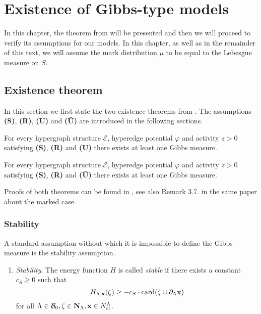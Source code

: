 \chapter{Existence of Gibbs-type models}\label{ch:3}
In this chapter, the theorem from \cite{DDG12} will be presented and then we will proceed to verify its assumptions for our models. In this chapter, as well as in the remainder of this text, we will assume  the mark distribution $\mu$ to be equal to the Lebesgue measure on $S$.

\section{Existence theorem}
In this section we first state the two existence theorems from \cite{DDG12}. The assumptions  \textbf{(S)}, \textbf{(R)}, \textbf{(U)} and \textbf{(\^U)} are introduced in the following sections. 

\begin{theorem}
	For every hypergraph structure $\mathcal E$, hyperedge potential $\varphi$ and activity $z>0$ satisfying \textbf{(S)}, \textbf{(R)} and \textbf{(U)} there exists at least one Gibbs measure.
\end{theorem}

\begin{theorem}
	For every hypergraph structure $\mathcal E$, hyperedge potential $\varphi$ and activity $z>0$ satisfying \textbf{(S)}, \textbf{(R)} and \textbf{(\^{U})} there exists at least one Gibbs measure.
\end{theorem}

Proofs of both theorems can be found in \cite{DDG12}, see also Remark 3.7. in the same paper about the marked case.

\subsection{Stability}\label{sec:stability}
A standard assumption without which it is impossible to define the Gibbs measure is the stability assumption. 

\begin{enumerate}[\textbf{(S)}] 
	\item \textit{Stability}. The energy function $H$ is called \textit{stable} if there exists a constant $c_S \geq 0$ such that 
		$$H_{\Lambda,{\mathbf{x}}}(\zeta) \geq -c_S \cdot \mathrm{card}(\zeta \cup \partial_\Lambda {\mathbf{x}})$$
for all $\Lambda \in \mathcal B_0, \zeta \in \mathbf N_\Lambda, {\mathbf{x}} \in N^\Lambda_{\text{cr}}$.
\end{enumerate}


